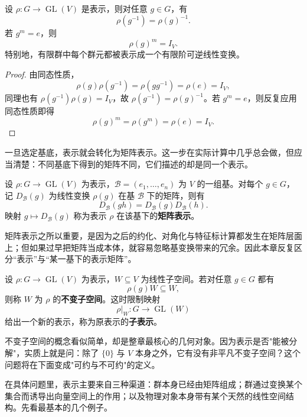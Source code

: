 \begin{proposition}[表示的基本恒等式]
设 $\rho:G\to \operatorname{GL}(V)$ 是表示，则对任意 $g\in G$，有
\[
\rho(g^{-1})=\rho(g)^{-1}.
\]
若 $g^m=e$，则
\[
\rho(g)^m=I_V.
\]
特别地，有限群中每个群元都被表示成一个有限阶可逆线性变换。
\label{prop:basic-identities-rep}

\end{proposition}

\begin{proof}
由同态性质，
\[
\rho(g)\rho(g^{-1})=\rho(gg^{-1})=\rho(e)=I_V,
\]
同理也有 $\rho(g^{-1})\rho(g)=I_V$，故 $\rho(g^{-1})=\rho(g)^{-1}$。若 $g^m=e$，则反复应用同态性质即得
\[
\rho(g)^m=\rho(g^m)=\rho(e)=I_V.
\]
\end{proof}

一旦选定基底，表示就会转化为矩阵表示。这一步在实际计算中几乎总会做，但应当清楚：不同基底下得到的矩阵不同，它们描述的却是同一个表示。

\begin{definition}[矩阵表示]
设 $\rho:G\to\operatorname{GL}(V)$ 为表示，$\mathcal B=(e_1,\dots,e_n)$ 为 $V$ 的一组基。对每个 $g\in G$，记 $D_{\mathcal B}(g)$ 为线性变换 $\rho(g)$ 在基 $\mathcal B$ 下的矩阵，则有
\[
D_{\mathcal B}(gh)=D_{\mathcal B}(g)D_{\mathcal B}(h).
\]
映射 $g\mapsto D_{\mathcal B}(g)$ 称为表示 $\rho$ 在该基下的\textbf{矩阵表示}。
\label{def:matrix-representation}
\end{definition}

矩阵表示之所以重要，是因为之后的约化、对角化与特征标计算都发生在矩阵层面上；但如果过早把矩阵当成本体，就容易忽略基变换带来的冗余。因此本章反复区分“表示”与“某一基下的表示矩阵”。

\begin{definition}[子表示与不变子空间]
设 $\rho:G\to\operatorname{GL}(V)$ 为表示，$W\subseteq V$ 为线性子空间。若对任意 $g\in G$ 都有
\[
\rho(g)W\subseteq W,
\]
则称 $W$ 为 $\rho$ 的\textbf{不变子空间}。这时限制映射
\[
\rho\vert_W:G\to\operatorname{GL}(W)
\]
给出一个新的表示，称为原表示的\textbf{子表示}。
\label{def:subrepresentation}
\end{definition}

不变子空间的概念看似简单，却是整章最核心的几何对象。因为表示是否"能被分解"，实质上就是问：除了 $\{0\}$ 与 $V$ 本身之外，它有没有非平凡不变子空间？这个问题将在下面变成"可约与不可约"的定义。

在具体问题里，表示主要来自三种渠道：群本身已经由矩阵组成；群通过变换某个集合而诱导出向量空间上的作用；以及物理对象本身带有某个天然的线性空间结构。先看最基本的几个例子。

